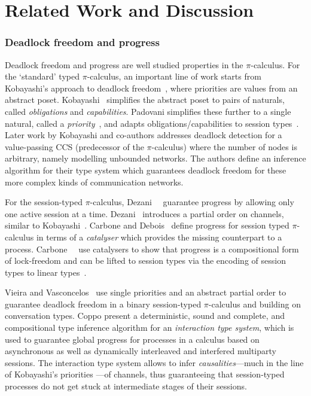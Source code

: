 \section{Related Work and Discussion}

\subsubsection*{Deadlock freedom and progress}
Deadlock freedom and progress are well studied properties in the $\pi$-calculus.
For the `standard' typed $\pi$-calculus, an important line of work starts from Kobayashi's approach to deadlock freedom~\cite{kobayashi98}, where priorities are values from an abstract poset. Kobayashi~\cite{kobayashi06} simplifies the abstract poset to pairs of naturals, called \emph{obligations} and \emph{capabilities}. Padovani simplifies these further to a single natural, called a \emph{priority}~\cite{padovani14}, and adapts obligations/capabilities to session types~\cite{padovani13}. Later work by Kobayashi and co-authors \cite{GiachinoKL14,kobayashilaneve17} addresses deadlock detection for a value-passing CCS (predecessor of the $\pi$-calculus) where the number of nodes is arbitrary, namely modelling unbounded networks. The authors define an inference algorithm for their type system which guarantees deadlock freedom for these more complex kinds of communication networks.

For the session-typed $\pi$-calculus, Dezani~\etal~\cite{dezani-ciancaglinimostrous06} guarantee progress by allowing only one active session at a time. Dezani~\cite{dezani-ciancagliniliguoro09progress} introduces a partial order on channels, similar to Kobayashi~\cite{kobayashi98}.
Carbone and Debois~\cite{carbonedebois10} define progress for session typed $\pi$-calculus in terms of a \emph{catalyser} which provides the missing counterpart to a process. Carbone~\etal~\cite{carbonedardha14} use catalysers to show that progress is a compositional form of lock-freedom and can be lifted to session types via the encoding of session types to linear types~\cite{kobayashi07,dardhagiachino12,dardha14beat,dardhaetal17}.


Vieira and Vasconcelos~\cite{vieiravasconcelos13} use single priorities and an abstract partial order to guarantee deadlock freedom in a binary session-typed $\pi$-calculus and building on conversation types.
Coppo \etal \cite{coppoetal13,coppoetal16} present a deterministic, sound and complete, and compositional type inference algorithm for an \emph{interaction type system}, which is used to guarantee global progress for processes in a calculus based on asynchronous as well as dynamically interleaved and interfered multiparty sessions. The interaction type system allows to infer \emph{causalities}---much in the line of Kobayashi's priorities ---of channels, thus guaranteeing that session-typed processes do not get stuck at intermediate stages of their sessions.

